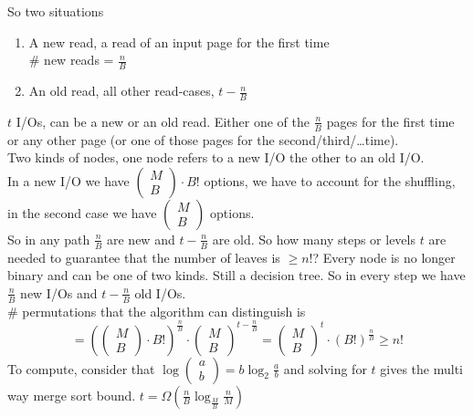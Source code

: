 \documentclass[10pt]{report}
\begin{document}
\pagebreak
So two situations \begin{enumerate}
	\item A new read, a read of an input page for the first time\\
	\# new reads = $\frac{n}{B}$
	\item An old read, all other read-cases, $t - \frac{n}{B}$
\end{enumerate}
$t$ I/Os, can be a new or an old read. Either one of the $\frac{n}{B}$ pages for the first time or any other page (or one of those pages for the second/third/\ldots time).\\
Two kinds of nodes, one node refers to a new I/O the other to an old I/O.\\
In a new I/O we have $\left(\begin{array}{c}
M\\B
\end{array}\right)\cdot B!$ options, we have to account for the shuffling, in the second case we have $\left(\begin{array}{c}
M\\B
\end{array}\right)$ options.\\
So in any path $\frac{n}{B}$ are new and $t - \frac{n}{B}$ are old. So how many steps or levels $t$ are needed to guarantee that the number of leaves is $\geq n!$? Every node is no longer binary and can be one of two kinds. Still a decision tree. So in every step we have $\frac{n}{B}$ new I/Os and $t - \frac{n}{B}$ old I/Os.\\
\# permutations that the algorithm can distinguish is $$= \left( \left(\begin{array}{c}
M\\B
\end{array}\right)\cdot B!\right)^{\frac{n}{B}}\cdot \left(\begin{array}{c}
M\\B
\end{array}\right)^{t - \frac{n}{B}} = \left(\begin{array}{c}
M\\B
\end{array}\right)^{t}\cdot \left(B!\right)^{\frac{n}{B}} \geq n!$$
To compute, consider that $\log\left(\begin{array}{c}
a\\b
\end{array}\right) = b\log_2 \frac{a}{b}$ and solving for $t$ gives the multi way merge sort bound. $t = \Omega(\frac{n}{B}\log_{\frac{M}{B}} \frac{n}{M})$
\end{document}
